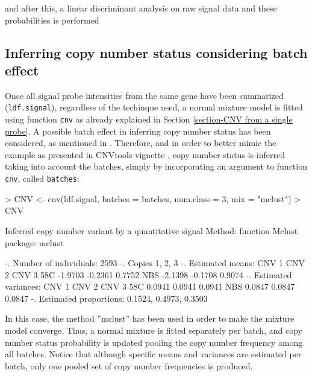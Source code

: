 \documentclass[11pt]{article}
\begin{document}
\noindent and after this, a linear discriminant analysis on raw signal data and these probabilities is performed
\begin{Schunk}
\end{Schunk}



\subsection{Inferring copy number status considering batch effect}

Once all signal probe intensities from the same gene have been summarized (\texttt{ldf.signal}), regardless of the techinque used, 
a normal mixture model is fitted using function  \texttt{cnv} as already explained in Section \ref{section-CNV from a single probe}.
A possible batch effect in inferring copy number status has been considered, as mentioned in \cite{CNVtools}.
Therefore, and in order to better mimic the example as presented in CNVtools vignette \cite{CNVtools-vignette}, 
copy number status is inferred taking into account the batches, simply by incorporating an argument to function \texttt{cnv}, called \texttt{batches}:
\begin{Schunk}
\begin{Sinput}
> CNV <- cnv(ldf.signal, batches = batches, num.class = 3, mix = "mclust")
> CNV
\end{Sinput}
\begin{Soutput}
Inferred copy number variant by a quantitative signal
   Method: function Mclust {package: mclust}  

-. Number of individuals: 2593 
-. Copies 1, 2, 3 
-. Estimated means:
      CNV 1   CNV 2  CNV 3
58C -1.9703 -0.2361 0.7752
NBS -2.1398 -0.1708 0.9074
-. Estimated variances:
     CNV 1  CNV 2  CNV 3
58C 0.0941 0.0941 0.0941
NBS 0.0847 0.0847 0.0847
-. Estimated proportions: 0.1524, 0.4973, 0.3503 
\end{Soutput}
\end{Schunk}

In this case, the method ''mclust'' has been used in order to make the mixture model converge.
Thus, a normal mixture is fitted separately per batch, and copy number status probability is updated pooling the copy number frequency
among all batches. Notice that although specific means and variances are estimated per batch, only one pooled set of copy number frequencies is produced.
\end{document}
